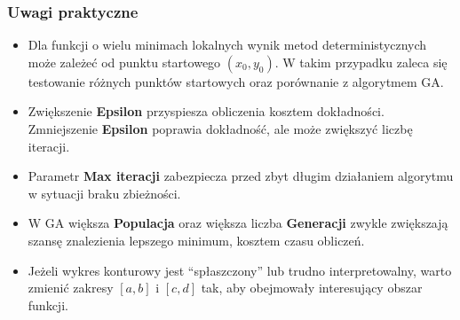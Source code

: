 \documentclass[10pt,a4paper]{article}
\begin{document}
\subsubsection{Uwagi praktyczne}

\begin{itemize}
\item Dla funkcji o wielu minimach lokalnych wynik metod deterministycznych może zależeć od punktu startowego $(x_0,y_0)$.
W takim przypadku zaleca się testowanie różnych punktów startowych oraz porównanie z algorytmem GA.
\item Zwiększenie \textbf{Epsilon} przyspiesza obliczenia kosztem dokładności.
Zmniejszenie \textbf{Epsilon} poprawia dokładność, ale może zwiększyć liczbę iteracji.
\item Parametr \textbf{Max iteracji} zabezpiecza przed zbyt długim działaniem algorytmu w sytuacji braku zbieżności.
\item W GA większa \textbf{Populacja} oraz większa liczba \textbf{Generacji} zwykle zwiększają szansę znalezienia lepszego minimum,
kosztem czasu obliczeń.
\item Jeżeli wykres konturowy jest ``spłaszczony'' lub trudno interpretowalny, warto zmienić zakresy $[a,b]$ i $[c,d]$
tak, aby obejmowały interesujący obszar funkcji.
\end{itemize}
\end{document}
